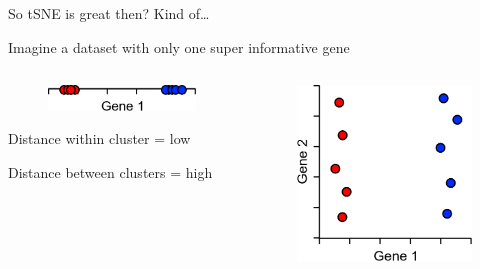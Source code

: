 \begin{frame}[allowframebreaks]{So tSNE is great then?}
    Kind of\dots

    Imagine a dataset with only one super informative gene

    \begin{columns}
    \begin{column}{0.33\textwidth}
        \begin{figure}
            \centering
            \includegraphics[width=1\textwidth,keepaspectratio]{images/dul/dim-reduce/slide_36_1_img.png}
        \end{figure}

        \vspace{1em}

Distance within cluster = low

\vspace{1em}
        
Distance between clusters = high
    \end{column}
    \begin{column}{0.33\textwidth}
        \begin{figure}
            \centering
            \includegraphics[width=1\textwidth,keepaspectratio]{images/dul/dim-reduce/slide_36_2_img.png}
        \end{figure}
        

\end{column}
\end{columns}
\end{frame}
